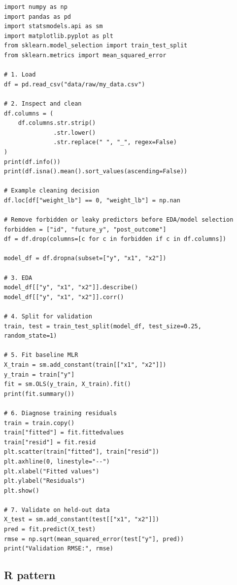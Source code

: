 \begin{verbatim}
import numpy as np
import pandas as pd
import statsmodels.api as sm
import matplotlib.pyplot as plt
from sklearn.model_selection import train_test_split
from sklearn.metrics import mean_squared_error

# 1. Load
df = pd.read_csv("data/raw/my_data.csv")

# 2. Inspect and clean
df.columns = (
    df.columns.str.strip()
              .str.lower()
              .str.replace(" ", "_", regex=False)
)
print(df.info())
print(df.isna().mean().sort_values(ascending=False))

# Example cleaning decision
df.loc[df["weight_lb"] == 0, "weight_lb"] = np.nan

# Remove forbidden or leaky predictors before EDA/model selection
forbidden = ["id", "future_y", "post_outcome"]
df = df.drop(columns=[c for c in forbidden if c in df.columns])

model_df = df.dropna(subset=["y", "x1", "x2"])

# 3. EDA
model_df[["y", "x1", "x2"]].describe()
model_df[["y", "x1", "x2"]].corr()

# 4. Split for validation
train, test = train_test_split(model_df, test_size=0.25, random_state=1)

# 5. Fit baseline MLR
X_train = sm.add_constant(train[["x1", "x2"]])
y_train = train["y"]
fit = sm.OLS(y_train, X_train).fit()
print(fit.summary())

# 6. Diagnose training residuals
train = train.copy()
train["fitted"] = fit.fittedvalues
train["resid"] = fit.resid
plt.scatter(train["fitted"], train["resid"])
plt.axhline(0, linestyle="--")
plt.xlabel("Fitted values")
plt.ylabel("Residuals")
plt.show()

# 7. Validate on held-out data
X_test = sm.add_constant(test[["x1", "x2"]])
pred = fit.predict(X_test)
rmse = np.sqrt(mean_squared_error(test["y"], pred))
print("Validation RMSE:", rmse)
\end{verbatim}

\subsection*{R pattern}


